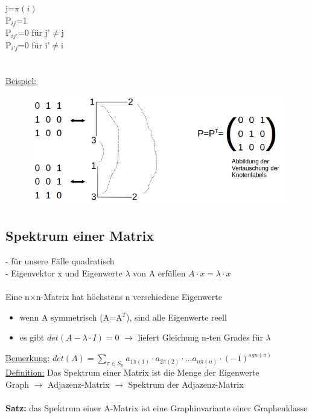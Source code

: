 j=$\pi(i)$\\
P$_{ij}$=1\\
P$_{ij'}$=0 für j'$\neq$j\\
P$_{i'j}$=0 für i'$\neq$i\\
\\\\
\underline{Beispiel:}
\begin{figure}[htp]
\centering
\includegraphics[width=1\textwidth]{lectures/161021/pix/pic13.jpg}
\end{figure}

\newpage
\subsection{Spektrum einer Matrix}
- für unsere Fälle quadratisch\\
- Eigenvektor x und Eigenwerte $\lambda$ von A erfüllen $A \cdot x = \lambda \cdot x$
\\\\
Eine n$\times$n-Matrix hat höchstens n verschiedene Eigenwerte
\begin{itemize}
	\item wenn A symmetrisch (A=A$^T$), sind alle Eigenwerte reell
	\item es gibt $det(A-\lambda \cdot I)=0$ $\rightarrow$ liefert Gleichung n-ten Grades für $\lambda$
\end{itemize}

\underline{Bemerkung:} $det(A) = \displaystyle \sum_{\pi \in S_n} a_{1 \pi (1)} \cdot a_{2 \pi (2)} \cdot ... a_{n \pi (n)} \cdot (-1)^{sgn(\pi)}$\\
\underline{Definition:} Das Spektrum einer Matrix ist die Menge der Eigenwerte\\
Graph $\rightarrow$ Adjazenz-Matrix $\rightarrow$ Spektrum der Adjazenz-Matrix
\\\\
\textbf{Satz:} das Spektrum einer A-Matrix ist eine Graphinvariante einer Graphenklasse
